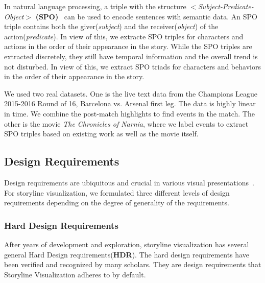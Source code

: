 In natural language processing, a triple with the structure \textit{$<$Subject-Predicate-Object$>$} \textbf{(SPO)}~\cite{hoffart_yago2_2013} can be used to encode sentences with semantic data. An SPO triple contains both the giver(\textit{subject}) and the receiver(\textit{object}) of the action(\textit{predicate}). In view of this, we extracte SPO triples for characters and actions in the order of their appearance in the story. While the SPO triples are extracted discretely, they still have temporal information and the overall trend is not disturbed. In view of this, we extract SPO triads for characters and behaviors in the order of their appearance in the story.

We used two real datasets. One is the live text data from the Champions League 2015-2016 Round of 16, Barcelona vs. Arsenal first leg. The data is highly linear in time. We combine the post-match highlights to find events in the match. The other is the movie \textit{The Chronicles of Narnia}, where we label events to extract SPO triples based on existing work as well as the movie itself.
\subsection{Design Requirements}
\noindent Design requirements are ubiquitous and crucial in various visual presentations~\cite{tanahashi_design_2012}. For storyline visualization, we formulated three different levels of design requirements depending on the degree of generality of the requirements.

\subsubsection{Hard Design Requirements}
\noindent After years of development and exploration, storyline visualization has several general Hard Design requirements(\textbf{HDR}). The hard design requirements have been verified and recognized by many scholars. They are design requirements that Storyline Visualization adheres to by default.

